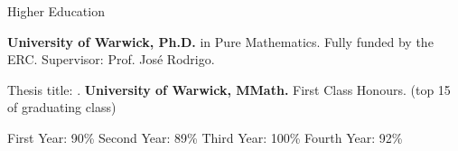 
\begin{rubric}{Higher Education}

	\entry*[\mydaterange{2015}{2019}]%
	\textbf{University of Warwick, Ph.D.}  in Pure Mathematics. Fully funded by the ERC. Supervisor: Prof. Jos\'e Rodrigo. \par Thesis title: .
%
	\entry*[\mydaterange{2011}{2015}]%
	\textbf{University of Warwick, MMath.} First Class Honours. (top 15 of graduating class)
	
	\par
	    First Year: 90\% \hspace{1.7em} Second Year: 89\% \hspace{1.7em}  Third Year: 100\% \hspace{1.7em}  Fourth Year: 92\%
 \end{rubric}
